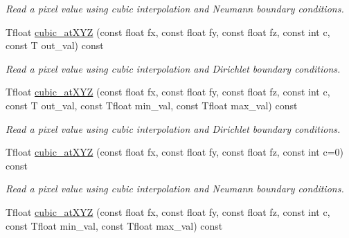 \begin{DoxyCompactItemize}
\begin{DoxyCompactList}\small\item\em Read a pixel value using cubic interpolation and Neumann boundary conditions. \item\end{DoxyCompactList}\item 
\hypertarget{structcimg__library_1_1CImg_a3499591d41a31050e3b32b33cebae444}{
Tfloat \hyperlink{structcimg__library_1_1CImg_a3499591d41a31050e3b32b33cebae444}{cubic\_\-atXYZ} (const float fx, const float fy, const float fz, const int c, const T out\_\-val) const }
\label{structcimg__library_1_1CImg_a3499591d41a31050e3b32b33cebae444}

\begin{DoxyCompactList}\small\item\em Read a pixel value using cubic interpolation and Dirichlet boundary conditions. \item\end{DoxyCompactList}\item 
\hypertarget{structcimg__library_1_1CImg_aeae9137f696c86a59fc93ae098494a05}{
Tfloat \hyperlink{structcimg__library_1_1CImg_aeae9137f696c86a59fc93ae098494a05}{cubic\_\-atXYZ} (const float fx, const float fy, const float fz, const int c, const T out\_\-val, const Tfloat min\_\-val, const Tfloat max\_\-val) const }
\label{structcimg__library_1_1CImg_aeae9137f696c86a59fc93ae098494a05}

\begin{DoxyCompactList}\small\item\em Read a pixel value using cubic interpolation and Dirichlet boundary conditions. \item\end{DoxyCompactList}\item 
\hypertarget{structcimg__library_1_1CImg_a205e8cfdefcbfd8efe40024428a2dff3}{
Tfloat \hyperlink{structcimg__library_1_1CImg_a205e8cfdefcbfd8efe40024428a2dff3}{cubic\_\-atXYZ} (const float fx, const float fy, const float fz, const int c=0) const }
\label{structcimg__library_1_1CImg_a205e8cfdefcbfd8efe40024428a2dff3}

\begin{DoxyCompactList}\small\item\em Read a pixel value using cubic interpolation and Neumann boundary conditions. \item\end{DoxyCompactList}\item 
\hypertarget{structcimg__library_1_1CImg_a5600b2394be2578705a842d626ad44ac}{
Tfloat \hyperlink{structcimg__library_1_1CImg_a5600b2394be2578705a842d626ad44ac}{cubic\_\-atXYZ} (const float fx, const float fy, const float fz, const int c, const Tfloat min\_\-val, const Tfloat max\_\-val) const }
\label{structcimg__library_1_1CImg_a5600b2394be2578705a842d626ad44ac}


\end{DoxyCompactItemize}

